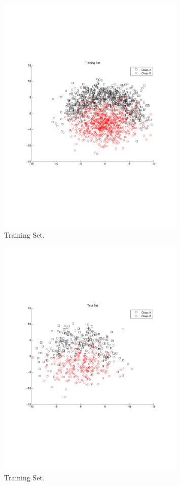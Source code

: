 \documentclass[letterpaper,11pt]{article}
\begin{document}
 \begin{figure}[h!]
\centering
  \includegraphics[trim = 0cm 7.5cm 0cm 7.5cm, clip, width=0.8\textwidth]{figures/TrainingSet.pdf}
  \caption{Training Set.}
  \label{fig:1}
\end{figure}
 
  \begin{figure}[t!]
\centering
  \includegraphics[trim = 0cm 7.5cm 0cm 7.5cm, clip, width=0.8\textwidth]{figures/TestSet.pdf}
  \caption{Training Set.}
  \label{fig:2}
\end{figure}
\end{document}
